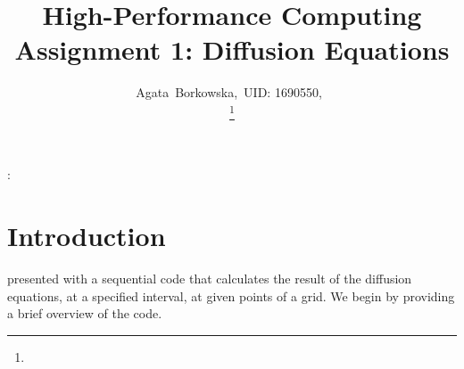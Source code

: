 \documentclass[11pt,journal]{IEEEtran}
\begin{document}
	\title{High-Performance Computing Assignment 1: Diffusion Equations}
	
	\author{Agata~Borkowska,~UID: 1690550,~%
		\protect\\
		\thanks{}}
	
	
	\markboth{}%
	{ \MakeLowercase{\textit{}}: }
	
	
	
	\maketitle
	
	
	\IEEEdisplaynotcompsoctitleabstractindextext
	
	
	\IEEEpeerreviewmaketitle
	
	
	
	\section{Introduction}
	 presented with a sequential code that calculates the result of the diffusion equations, at a specified interval, at given points of a grid. We begin by providing a brief overview of the code.
	
\end{document}
